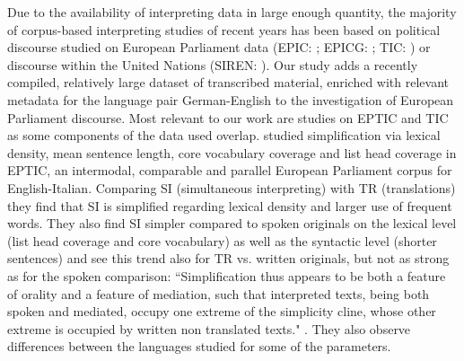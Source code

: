 \documentclass[output=paper,colorlinks,citecolor=brown]{langscibook}
\begin{document}
Due to the availability of interpreting data in large enough quantity, the majority of corpus-based interpreting studies of recent years has been based on political discourse studied on European Parliament data (EPIC: \cite{BendazzoliSandrelli2005,MontiEtAl2005,SandrelliBendazzoli2005,Sandrelli2010,Russo2012,BernardiniEtAl2016}; EPICG: \cite{Defrancq2018,PlevoetsDefrancq2018uccts}; TIC: \cite{KajzerWietrzny2012,Kajzer-Wietrzny2015}) or discourse within the United Nations (SIREN: \citealt{Dayter2018}). Our study adds a recently compiled, relatively large dataset of transcribed material, enriched with relevant metadata for the language pair German-English to the investigation of European Parliament discourse.
Most relevant to our work are studies on EPTIC \citep{BernardiniEtAl2016,Ferraresi2018} and TIC \citep{KajzerWietrzny2012,Kajzer-Wietrzny2015} as some components of the data used overlap. 
\citet{BernardiniEtAl2016} studied simplification via lexical density, mean sentence length, core vocabulary coverage and list head coverage in  EPTIC, an intermodal, comparable and parallel European Parliament corpus for English-Italian. Comparing SI (simultaneous interpreting) with TR (translations) they find that SI is simplified regarding lexical density and larger use of frequent words. They also find SI simpler compared to spoken originals on the lexical level (list head coverage and core vocabulary) as well as the syntactic level (shorter sentences) and see this trend also for TR vs. written originals, but not as strong as for the spoken comparison:  “Simplification thus appears to be both a feature of orality and a feature of mediation, such that interpreted texts, being both spoken and mediated, occupy one extreme of the simplicity cline, whose other extreme is occupied by written non translated texts." \citep[81]{BernardiniEtAl2016}. They also observe differences between the languages studied for some of the parameters.
\end{document}
